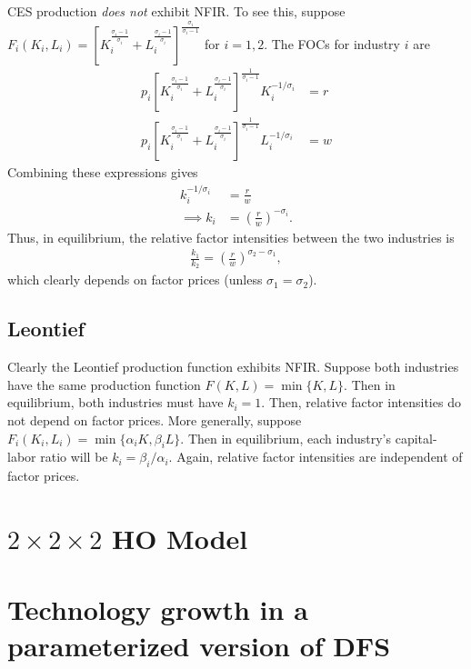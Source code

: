 \documentclass[12pt]{article}
\begin{document}
CES production \textit{does not} exhibit NFIR. To see this, suppose $F_i(K_i,L_i) = \left[K_i^{\frac{\sigma_i - 1}{\sigma_i}} + L_i^{\frac{\sigma_i - 1}{\sigma_i}}\right]^{\frac{\sigma_i}{\sigma_i - 1}}$ for $i = 1,2$. The FOCs for industry $i$ are
\begin{align}
p_i\left[K_i^{\frac{\sigma_i - 1}{\sigma_i}} + L_i^{\frac{\sigma_i - 1}{\sigma_i}}\right]^{\frac{1}{\sigma_i - 1}}K_i^{-1/\sigma_i} &= r \label{eq:ces1}\\
p_i\left[K_i^{\frac{\sigma_i - 1}{\sigma_i}} + L_i^{\frac{\sigma_i - 1}{\sigma_i}}\right]^{\frac{1}{\sigma_i - 1}}L_i^{-1/\sigma_i} &= w \label{eq:ces1}
\end{align}
Combining these expressions gives
\begin{align*}
k_i^{-1/\sigma_i} &= \frac{r}{w}\\
\implies k_i &= \left(\frac{r}{w}\right)^{-\sigma_i}.
\end{align*}
Thus, in equilibrium, the relative factor intensities between the two industries is
\begin{align*}
\frac{k_1}{k_2} = \left(\frac{r}{w}\right)^{\sigma_2-\sigma_1},
\end{align*}
which clearly depends on factor prices (unless $\sigma_1 = \sigma_2$).\\

\subsection{Leontief}

Clearly the Leontief production function exhibits NFIR. Suppose both industries have the same production function $F(K,L) = \min\{K,L\}$. Then in equilibrium, both industries must have $k_i = 1$. Then, relative factor intensities do not depend on factor prices. More generally, suppose $F_i(K_i,L_i) = \min\{\alpha_iK,\beta_iL\}$. Then in equilibrium, each industry's capital-labor ratio will be $k_i = \beta_i/\alpha_i$. Again, relative factor intensities are independent of factor prices.

\newpage

\section{$2 \times 2 \times 2$ HO Model}

\newpage

\section{Technology growth in a parameterized version of DFS}
\end{document}
